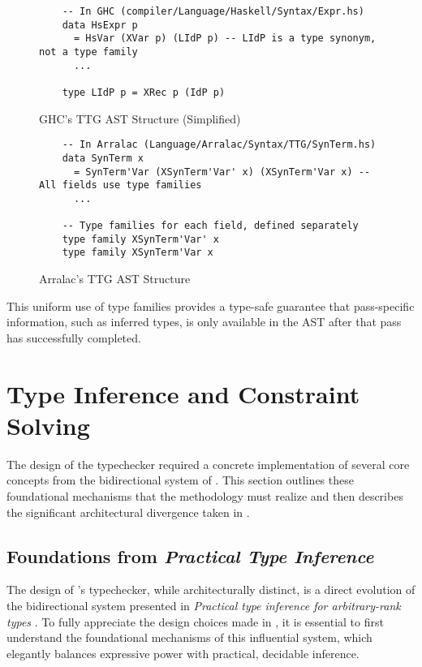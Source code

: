 \begin{figure}
    \centering
    \begin{verbatim}
    -- In GHC (compiler/Language/Haskell/Syntax/Expr.hs)
    data HsExpr p
      = HsVar (XVar p) (LIdP p) -- LIdP is a type synonym, not a type family
      ...
    
    type LIdP p = XRec p (IdP p)
    \end{verbatim}
    \caption{GHC's TTG AST Structure (Simplified)}
\end{figure}

\begin{figure}
    \centering
    \begin{verbatim}
    -- In Arralac (Language/Arralac/Syntax/TTG/SynTerm.hs)
    data SynTerm x
      = SynTerm'Var (XSynTerm'Var' x) (XSynTerm'Var x) -- All fields use type families
      ...
    
    -- Type families for each field, defined separately
    type family XSynTerm'Var' x
    type family XSynTerm'Var x
    \end{verbatim}
    \caption{Arralac's TTG AST Structure}
\end{figure}

This uniform use of type families provides a type-safe guarantee that pass-specific information, such as inferred types, is only available in the AST after that pass has successfully completed.

\section{Type Inference and Constraint Solving}
\label{sec:Design:TypeInference}

The design of the \Arralac typechecker required a concrete implementation of several core concepts from the bidirectional system of \cite{jones-practical-2007}. This section outlines these foundational mechanisms that the methodology must realize and then describes the significant architectural divergence taken in \Arralac.

\subsection{Foundations from \textit{Practical Type Inference}}
\label{sec:Design:Foundations}

The design of \Arralac's typechecker, while architecturally distinct, is a direct evolution of the bidirectional system presented in \textit{Practical type inference for arbitrary-rank types} \cite{jones-practical-2007}. To fully appreciate the design choices made in \Arralac, it is essential to first understand the foundational mechanisms of this influential system, which elegantly balances expressive power with practical, decidable inference.

